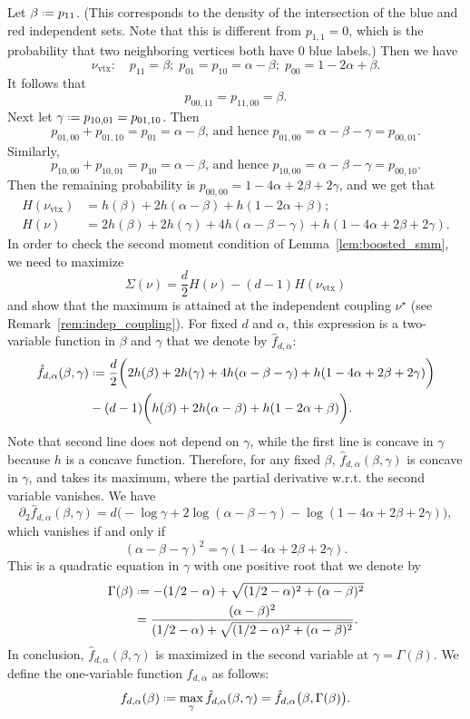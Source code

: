 \documentclass[12pt]{amsart}
\theoremstyle{definition}
\newcommand\fhat{\hat{f}}
\newcommand\al{\alpha}
\newcommand\be{\beta}
\newcommand\ga{\gamma}
\newcommand\Ga{\Gamma}
\newcommand\nustar{\nu^{\star}}
\newcommand\nuvtx{\nu_\mathrm{vtx}}
\newcommand{\defeq}{\mathrel{\vcenter{\baselineskip0.5ex \lineskiplimit0pt
                     \hbox{\scriptsize.}\hbox{\scriptsize.}}}%
                     =}
\begin{document}
Let $\be \defeq p_{11}$. (This corresponds to the density of the intersection of the blue and red independent sets. Note that this is different from $p_{1,1}=0$, which is the probability that two neighboring vertices both have $0$ blue labels.) Then we have 
%
\[ \nuvtx: \quad 
p_{11}=\be; \; p_{01}=p_{10}=\al-\be; \; p_{00}=1-2\al+\be .\]
%
It follows that 
%
\[ p_{00,11}=p_{11,00}=\be .\]
%
Next let $\ga \defeq p_{10,01}=p_{01,10}$. Then 
%
\[ p_{01,00}+p_{01,10}=p_{01}=\al-\be 
\text{, and hence } 
p_{01,00}= \al-\be-\ga = p_{00,01}.\]
%
Similarly,
%
\[ p_{10,00}+p_{10,01}=p_{10}=\al-\be 
\text{, and hence } 
p_{10,00}= \al-\be-\ga = p_{00,10}.\]
%
Then the remaining probability is $p_{00,00}=1-4\al+2\be+2\ga$, and we get that 
%
\begin{align*}
H(\nuvtx) &=  h(\be)+ 2h(\al-\be) + h(1-2\al+\be) ; \\
H(\nu) &= 2h(\be)+2h(\ga)+4h(\al-\be-\ga) + h(1-4\al+2\be+2\ga) .
\end{align*} 
%
In order to check the second moment condition of Lemma~\ref{lem:boosted_smm}, we need to maximize 
%
\[ \Sigma(\nu) = \frac{d}{2} H(\nu) - (d-1) H(\nuvtx) \]
%
and show that the maximum is attained at the independent coupling $\nustar$ (see Remark~\ref{rem:indep_coupling}). For fixed $d$ and $\al$, this expression is a two-variable function in $\be$ and $\ga$ that we denote by $\fhat_{d,\al}$:
%
\begin{align}
\begin{split} \label{eq:fhat}
\fhat_{d,\al}(\be,\ga)  
&\defeq \frac{d}{2} \bigg( 2h(\be)+2h(\ga)
+4h(\al-\be-\ga) + h(1-4\al+2\be+2\ga) \bigg) \\
& - (d-1) \bigg( h(\be)+ 2h(\al-\be) 
+ h(1-2\al+\be) \bigg) .
\end{split}
\end{align} 
%
Note that second line does not depend on $\ga$, while the first line is concave in $\ga$ because $h$ is a concave function. Therefore, for any fixed $\be$, $\fhat_{d,\al}(\be,\ga)$ is concave in $\ga$, and takes its maximum, where the partial derivative w.r.t. the second variable vanishes. We have  
%
\[ \partial_2 \fhat_{d,\al} (\be,\ga)
= d \bigg( -\log \ga +2 \log(\al-\be-\ga) - \log(1-4\al+2\be+2\ga) \bigg) ,\]
%
which vanishes if and only if 
%
\[ (\al-\be-\ga)^2=\ga(1-4\al+2\be+2\ga) .\]
%
This is a quadratic equation in $\ga$ with one positive root that we denote by 
%
\begin{align}
\Ga(\be) 
&\defeq -(1/2-\al)+\sqrt{(1/2-\al)^2+(\al-\be)^2} 
\label{eq:Ga_first} \\
&= \frac{(\al-\be)^2}{(1/2-\al) 
+\sqrt{(1/2-\al)^2+(\al-\be)^2}} .
\label{eq:Ga_second}
\end{align}  
%
In conclusion, $\fhat_{d,\al}(\be,\ga)$ is maximized in the second variable at $\ga=\Ga(\be)$. We define the one-variable function $f_{d,\al}$ as follows:
%
\begin{equation} \label{eq:f_al}
f_{d,\al}(\be) 
\defeq \max_{\ga} \fhat_{d,\al}(\be,\ga) 
= \fhat_{d,\al}\big(\be,\Ga(\be) \big) .
\end{equation}
%
\end{document}

